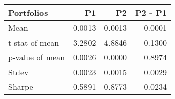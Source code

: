 \begin{tabular}{lrrr}
\toprule
Portfolios & P1 & P2 & P2 - P1 \\
\midrule
Mean & 0.0013 & 0.0013 & -0.0001 \\
t-stat of mean & 3.2802 & 4.8846 & -0.1300 \\
p-value of mean & 0.0026 & 0.0000 & 0.8974 \\
Stdev & 0.0023 & 0.0015 & 0.0029 \\
Sharpe & 0.5891 & 0.8773 & -0.0234 \\
\bottomrule
\end{tabular}
